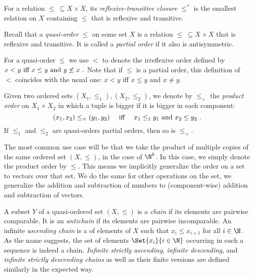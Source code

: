 \documentclass[../../diss.tex]{subfiles}
\begin{document}
For a relation $\leq \ \subseteq X \times X$, its \emph{reflexive-transitive closure} $\leq^*$ is the smallest relation on $X$ containing $\leq$ that is reflexive and transitive.

Recall that a \emph{quasi-order} $\leq$ on some set $X$ is a relation $\leq \ \subseteq X \times X$ that is reflexive and transitive.
It is called a \emph{partial order} if it also is antisymmetric.

For a quasi-order $\leq$ we use $<$ to denote the irreflexive order defined by
\(
    x < y
    {\text{ iff }}
    x \leq y {\text{ and }} y \not\leq x
    \ .
\)
Note that if $\leq$ is a partial order, this definition of $<$ coincides with the usual one: $x < y$ iff $x \leq y$ and $x \neq y$.


Given two ordered sets $(X_1,\leq_1), (X_2,\leq_2)$, we denote by $\leq_\times$ the \emph{product order} on $X_1 \times X_2$ in which a tuple is bigger if it is bigger in each component:
\[
    (x_1,x_2) \leq_\times (y_1,y_2)
    \quad {\text{ iff }} \quad
    x_1 \leq_1 y_1 {\text{ and }} x_2 \leq y_2
    \ .
\]
If $\leq_1$ and $\leq_2$ are quasi-orders \resp partial orders, then so is $\leq_\times$.

The most common use case will be that we take the product of multiple copies of the same ordered set $(X,\leq)$, \eg in the case of $\N^k$.
In this case, we simply denote the product order by $\leq$.
This means we implicitly generalize the order on a set to vectors over that set.
We do the same for other operations on the set, \eg we generalize the addition and subtraction of numbers to (component-wise) addition and subtraction of vectors.


A subset $Y$ of a quasi-ordered set $(X,\leq)$ is a \emph{chain} if its elements are pairwise comparable.
It is an \emph{antichain} if its elements are pairwise incomparable.
An infinite \emph{ascending chain} is a  of elements of $X$ such that $x_i \leq x_{i+1}$ for all $i \in \N$.
As the name suggests, the set of elements $\Set{ x_i }{i \in \N}$ occurring in such a sequence is indeed a chain.
\emph{Infinite strictly ascending}, \emph{infinite descending}, and \emph{infinite strictly descending chains} as well as their finite versions are defined similarly in the expected way.
\end{document}

